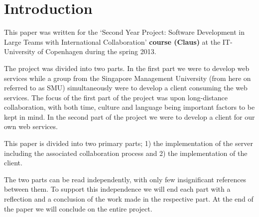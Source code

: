 \section{Introduction}
This paper was written for the `Second Year Project: Software Development in Large Teams with International Collaboration' \textbf{course (Claus)} at the IT-University of Copenhagen during the spring 2013.

The project was divided into two parts. In the first part we were to develop web services while a group from the Singapore Management University (from here on referred to as SMU) simultaneously were to develop a client consuming the web services.
The focus of the first part of the project was upon long-distance collaboration, with both time, culture and language being important factors to be kept in mind.
In the second part of the project we were to develop a client for our own web services.

This paper is divided into two primary parts; 1) the implementation of the server including the associated collaboration process and 2) the implementation of the client.

The two parts can be read independently, with only few insignificant references between them. To support this independence we will end each part with a reflection and a conclusion of the work made in the respective part.
At the end of the paper we will conclude on the entire project.
\newpage